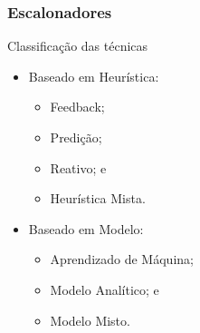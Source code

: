 \documentclass[10pt, pdf,xcolor=pdftex,dvipsnames,table]{beamer}
\begin{document}
\begin{frame} \frametitle{Escalonadores}
\begin{block}{Classificação das técnicas}
\begin{itemize}
	\item Baseado em Heurística:
	\begin{itemize}
	    \item Feedback;
	    \item Predição;
	    \item Reativo; e
	    \item Heurística Mista.
	\end{itemize}
	\item Baseado em Modelo:
	\begin{itemize}
	    \item Aprendizado de Máquina;
	    \item Modelo Analítico; e
	    \item Modelo Misto.
	\end{itemize}
\end{itemize}
\end{block}
\end{frame}
\end{document}
